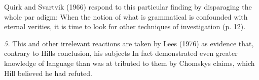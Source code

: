 \setcounter{listWWNumxxxivleveli}{4}
\begin{listWWNumxxxivleveli}
\item 
\setcounter{listWWNumxxxivlevelii}{0}
\begin{listWWNumxxxivlevelii}
\item 
\setcounter{listWWNumxxxivleveliii}{0}
\begin{listWWNumxxxivleveliii}
\item 
\begin{styleStandard}
Quirk and Svartvik (1966) respond to this particular finding by disparaging the whole par\- adigm: {\textquotedbl}When the notion of what is grammatical is confounded with eternal verities, it is time to look for other techniques of investigation{\textquotedbl} (p. 12).
\end{styleStandard}


\end{listWWNumxxxivleveliii}
\end{listWWNumxxxivlevelii}
\end{listWWNumxxxivleveli}
\begin{styleStandard}
\textit{5.}\textit{ }This and other irrelevant reactions are taken by Lees (1976) as evidence that, contrary to Hill{\textquotesingle}s conclusion, his subjects In fact demonstrated even greater knowledge of language than was at tributed to them by Chomsky{\textquotesingle}s claims, which Hill believed he had refuted.
\end{styleStandard}


